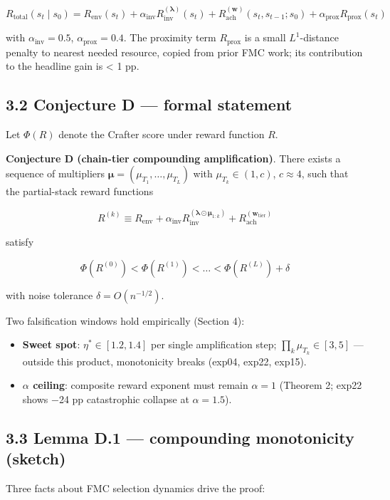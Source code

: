 \[
R_{\text{total}}(s_t \mid s_0) = R_{\text{env}}(s_t) + \alpha_{\text{inv}} R_{\text{inv}}^{(\boldsymbol\lambda)}(s_t) + R_{\text{ach}}^{(\mathbf{w})}(s_t, s_{t-1}; s_0) + \alpha_{\text{prox}} R_{\text{prox}}(s_t)
\]

with $\alpha_{\text{inv}} = 0.5$, $\alpha_{\text{prox}} = 0.4$. The
proximity term $R_{\text{prox}}$ is a small $L^1$-distance penalty to
nearest needed resource, copied from prior FMC work; its contribution
to the headline gain is < 1 pp.

\subsection{3.2 Conjecture D — formal statement}

Let $\Phi(R)$ denote the Crafter score under reward function $R$.

\textbf{Conjecture D (chain-tier compounding amplification)}. There exists a
sequence of multipliers $\boldsymbol\mu = (\mu_{T_1}, \dots, \mu_{T_L})$
with $\mu_{T_k} \in (1, c)$, $c \approx 4$, such that the partial-stack
reward functions

\[
R^{(k)} \equiv R_{\text{env}} + \alpha_{\text{inv}} R_{\text{inv}}^{(\boldsymbol\lambda \odot \boldsymbol\mu_{1:k})} + R_{\text{ach}}^{(\mathbf{w}_{\text{tier}})}
\]

satisfy

\[
\Phi(R^{(0)}) < \Phi(R^{(1)}) < \dots < \Phi(R^{(L)}) + \delta
\]

with noise tolerance $\delta = O(n^{-1/2})$.

Two falsification windows hold empirically (Section 4):

\begin{itemize}
\item \textbf{Sweet spot}: $\eta^* \in [1.2, 1.4]$ per single amplification step; $\prod_k \mu_{T_k} \in [3, 5]$ — outside this product, monotonicity breaks (exp04, exp22, exp15).
\item \textbf{$\alpha$ ceiling}: composite reward exponent must remain $\alpha = 1$ (Theorem 2; exp22 shows −24 pp catastrophic collapse at $\alpha = 1.5$).
\end{itemize}
\subsection{3.3 Lemma D.1 — compounding monotonicity (sketch)}

Three facts about FMC selection dynamics drive the proof:

